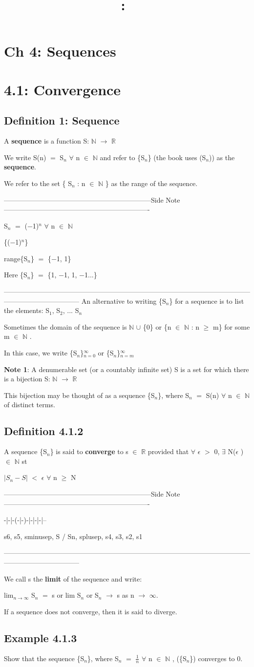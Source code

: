 \documentclass{article}
\title{
    \vspace{2in}
    \textmd{\textbf{\hmwkClass:\ \hmwkTitle}}\\
    \normalsize\vspace{0.1in}\small\vspace{0.1in}\large{\textit{\hmwkClassInstructor}}
    \vspace{3in}
}
\author{\hmwkAuthorName}
\date{}
\newcommand{\mt}[1]{\ensuremath{#1}}
\newcommand\bsc[2][\DefaultOpt]{%
  \def\DefaultOpt{#2}%
  \section[#1]{#2}%
}
\newcommand\ssc[2][\DefaultOpt]{%
  \def\DefaultOpt{#2}%
  \subsection[#1]{#2}%
}
\newcommand{\sidenote}[1]{-----------------------------------------------------------------Side Note----------------------------------------------------------------
#1 \

---------------------------------------------------------------------------------------------------------------------------------------------}
\newcommand{\br}{\mt{\mathbb{R}} }       %
\newcommand{\bn}{\mt{\mathbb{N}} }       %
\newcommand{\ep}{\mt{\epsilon} }         %
\newcommand{\fa}{\mt{\forall} }          %
\newcommand{\mem}{\mt{\in} }
\newcommand{\exs}{\mt{\exists} }
\newcommand{\lra}{ \mt{\longrightarrow} } %
\newcommand{\eql}{\mt{=} }
\newcommand{\uw}[2]{#1\mt{_{#2}}}
\newcommand{\frc}[2]{\mt{\frac{#1}{#2}}}
\begin{document}
\bsc{Ch 4: Sequences}{}

\bsc{4.1: Convergence}{

\ssc{Definition 1: Sequence}{

A \textbf{sequence} is a function S: \bn \lra \br

We write S(n) \eql \uw{S}{n} \fa n \mem \bn and refer to \{\uw{S}{n}\} (the book uses (\uw{S}{n})) as the \textbf{sequence}.

We refer to the set \{ \uw{S}{n} : n \mem \bn\} as the range of the sequence.

\sidenote{
\uw{S}{n} \eql ($-$1)$^n$ \fa n \mem \bn

\{($-$1)$^n$\}

range\{\uw{S}{n}\} \eql \{$-$1, 1\}

Here \{\uw{S}{n}\} \eql \{1, $-$1, 1, $-$1...\}
}
An alternative to writing \{\uw{S}{n}\} for a sequence is to list the elements: \uw{S}{1}, \uw{S}{2}, ... \uw{S}{n}

Sometimes the domain of the sequence is \bn $\cup$ \{0\} or \{n \mem \bn : n $\geq$ m\} for some m \mem \bn.

In this case, we write \{\uw{S}{n}\}$^\infty_{n = 0}$ or \{\uw{S}{n}\}$^\infty_{n = m}$

\textbf{Note 1}: A denumerable set (or a countably infinite set) S is a set for which there is a bijection S: \bn \lra \br

This bijection may be thought of as a sequence \{\uw{S}{n}\}, where \uw{S}{n} \eql S(n) \fa n \mem \bn of distinct terms.

\ssc{Definition 4.1.2}{

A sequence \{\uw{S}{n}\} is said to \textbf{converge} to s \mem \br provided that \fa \ep $>$ 0, \exs N(\ep) \mem \bn st

$|\uw{S}{n} - S|$ $<$ \ep \textrm{   } \fa n $\geq$ N

\sidenote{
-|-|-(-|-)-|-|-|-|--

s6, s5, sminusep, S / Sn, splusep, s4, s3, s2, s1
}

We call s the \textbf{limit} of the sequence and write:

lim$_{n\lra\infty}$ \uw{S}{n} \eql s  or  lim \uw{S}{n}   or \uw{S}{n} \lra s as n \lra $\infty$.

If a sequence does not converge, then it is said to diverge.

\ssc{Example 4.1.3}{

Show that the sequence \{\uw{S}{n}\}, where \uw{S}{n} \eql \frc{1}{n} \fa n \mem \bn, (\{\uw{S}{n}\}) converges to 0.

}}}}
\end{document}
